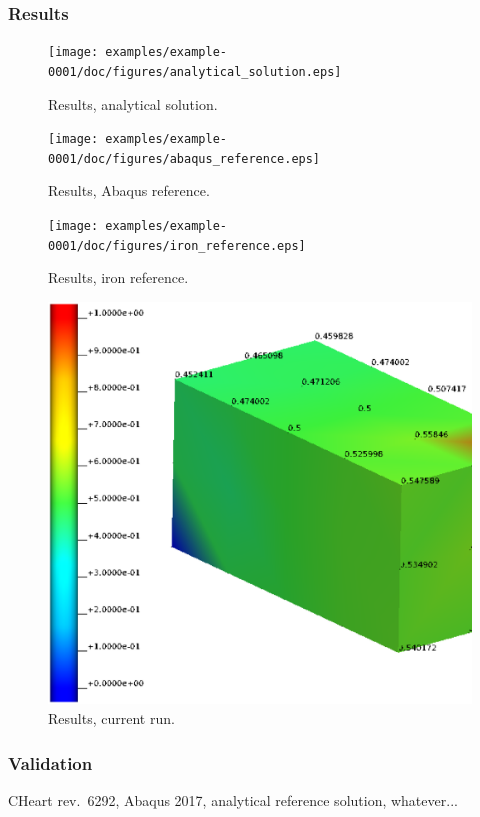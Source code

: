 \subsubsection{Results}
%
\begin{figure}[h!]
    \centering 
    \texttt{[image: examples/example-0001/doc/figures/analytical\_solution.eps]} 
    \caption{Results, analytical solution.}
    \label{example-0001-analytical-solution-fig}
\end{figure}
%
\begin{figure}[h!]
    \centering 
    \texttt{[image: examples/example-0001/doc/figures/abaqus\_reference.eps]} 
    \caption{Results, Abaqus reference.}
    \label{example-0001-abaqus-reference-fig}
\end{figure}
%
\begin{figure}[h!]
    \centering 
    \texttt{[image: examples/example-0001/doc/figures/iron\_reference.eps]} 
    \caption{Results, iron reference.}
    \label{example-0001-iron-reference-fig}
\end{figure}
%
\begin{figure}[h!]
    \centering 
    \includegraphics[width=\columnwidth]{examples/example-0001/doc/figures/current_run.eps} 
    \caption{Results, current run.}
    \label{example-0001-current-run-fig}
\end{figure}
%
%
\subsubsection{Validation}
%
CHeart rev.\ 6292, Abaqus 2017, analytical reference solution, whatever...
%
